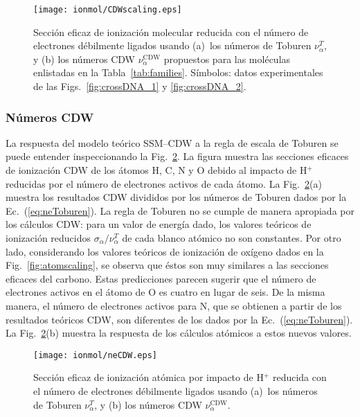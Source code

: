 \begin{figure}[t]
\centering
\texttt{[image: ionmol/CDWscaling.eps]}
\caption[Sección eficaz de ionización molecular reducida por $n_e$.]
{Sección eficaz de ionización molecular reducida con el número de 
electrones débilmente ligados usando 
(a)~los números de Toburen $\nu_{\alpha}^T$, y 
(b) los números CDW $\nu_{\alpha}^{\text{CDW}}$ propuestos para las 
moléculas enlistadas en la Tabla~\ref{tab:families}. 
Símbolos: datos experimentales de las Figs.~\ref{fig:crossDNA_1} y 
\ref{fig:crossDNA_2}.}
\label{fig:newscaling}
\end{figure}

\subsubsection*{Números CDW}
\label{subsec:CDW}

La respuesta del modelo teórico SSM--CDW a la regla de escala de Toburen 
se puede entender inspeccionando la Fig.~\ref{fig:neCDW}. La figura 
muestra las secciones eficaces de ionización CDW de los átomos H, C, N y 
O debido al impacto de H$^+$ reducidas por el número de electrones 
activos de cada átomo. La Fig.~\ref{fig:neCDW}(a) muestra los resultados 
CDW divididos por los números de Toburen dados por la 
Ec.~(\ref{eq:neToburen}). La regla de Toburen no se cumple de manera 
apropiada por los cálculos CDW: para un valor de energía dado, los 
valores teóricos de ionización reducidos 
$\sigma_{\alpha}/\nu_{\alpha}^T$ de cada blanco atómico no son 
constantes. Por otro lado, considerando los valores teóricos de 
ionización de oxígeno dados en la Fig.~\ref{fig:atomscaling}, se observa 
que éstos son muy similares a las secciones eficaces del carbono. Estas 
predicciones parecen sugerir que el número de electrones activos en el 
átomo de O es cuatro en lugar de seis. De la misma manera, el número de 
electrones activos para N, que se obtienen a partir de los resultados 
teóricos CDW, son diferentes de los dados por la 
Ec.~(\ref{eq:neToburen}). La Fig.~\ref{fig:neCDW}(b) muestra la 
respuesta de los cálculos atómicos a estos nuevos valores.

\begin{figure}[t]
\centering
\texttt{[image: ionmol/neCDW.eps]}
\caption[Sección eficaz de ionización atómica reducida por $n_e$.]
{Sección eficaz de ionización atómica por impacto de H$^+$ reducida con 
el número de electrones débilmente ligados usando 
(a)~los números de Toburen $\nu_{\alpha}^T$, y 
(b) los números CDW $\nu_{\alpha}^{\text{CDW}}$.}
\label{fig:neCDW}
\end{figure}

